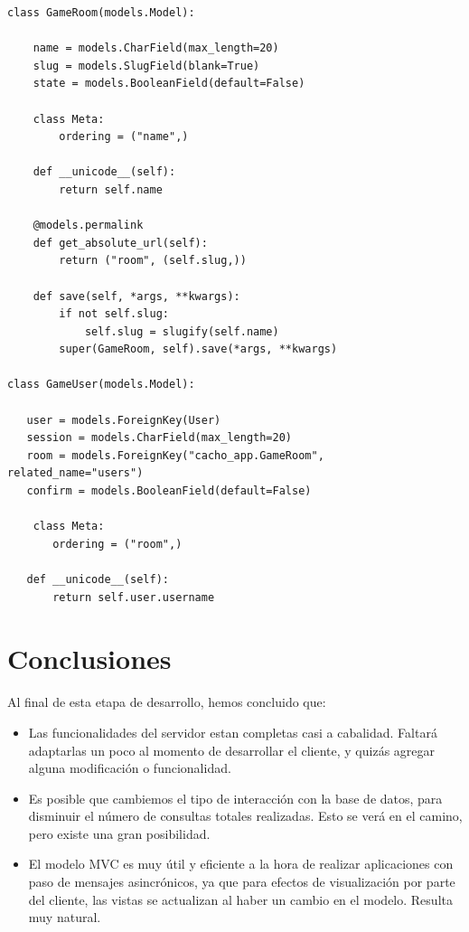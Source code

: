 \documentclass[a4paper,11pt]{article}
\begin{document}
\begin{lstlisting}[caption=cacho\_app/models.py]
class GameRoom(models.Model):

    name = models.CharField(max_length=20)
    slug = models.SlugField(blank=True)
    state = models.BooleanField(default=False) 

    class Meta:
        ordering = ("name",)

    def __unicode__(self):
        return self.name

    @models.permalink
    def get_absolute_url(self):
        return ("room", (self.slug,))

    def save(self, *args, **kwargs):
        if not self.slug:
            self.slug = slugify(self.name)
        super(GameRoom, self).save(*args, **kwargs)

class GameUser(models.Model):

   user = models.ForeignKey(User)
   session = models.CharField(max_length=20)
   room = models.ForeignKey("cacho_app.GameRoom", related_name="users")
   confirm = models.BooleanField(default=False)

	class Meta:
       ordering = ("room",)
   
   def __unicode__(self):
       return self.user.username

\end{lstlisting}

\newpage



\newpage

\section{Conclusiones}

	Al final de esta etapa de desarrollo, hemos concluido que:

\begin{itemize}
	\item Las funcionalidades del servidor estan completas casi a cabalidad.
	Faltará adaptarlas un poco al momento de desarrollar el cliente, y
	quizás agregar alguna modificación o funcionalidad.
	\item Es posible que cambiemos el tipo de interacción con la base de
	datos, para disminuir el número de consultas totales realizadas.
	Esto se verá en el camino, pero existe una gran posibilidad.
	\item El modelo MVC es muy útil y eficiente a la hora de realizar
	aplicaciones con paso de mensajes asincrónicos, ya que para efectos
	de visualización por parte del cliente, las vistas se actualizan 
	al haber un cambio en el modelo. Resulta muy natural.

\end{itemize}
\end{document}
